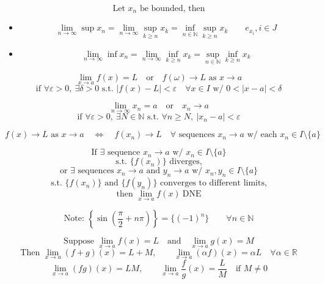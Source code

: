 \documentclass[11pt]{article}
\begin{document}


\[
\text{Let } x_n \text{ be bounded, then}
\]
\begin{itemize}
\item
\[
\lim_{n\to\infty}\sup x_n
=
\lim_{n\to\infty}\sup_{k\ge n} x_k
=
\inf_{n\in\mathbb N}\sup_{k\ge n}x_k
\qquad e_{x_i}, i\in J
\]
\item
\[
\lim_{n\to\infty}\inf x_n
=
\lim_{n\to\infty}\inf_{k\ge n} x_k
=
\sup_{n\in\mathbb N}\inf_{k\ge n}x_k
\]
\end{itemize}


\[
\lim_{x\to a} f(x)=L \quad \text{or} \quad f(\omega)\to L \text{ as } x\to a
\]
\[
\text{if } \forall \varepsilon>0,\ \exists \delta>0 \text{ s.t. }
|f(x)-L|<\varepsilon
\quad
\forall x\in I \text{ w/ } 0<|x-a|<\delta
\]


\[
\lim_{n\to\infty}x_n=a \quad \text{or} \quad x_n\to a
\]
\[
\text{if } \forall \varepsilon>0,\ \exists N\in\mathbb N \text{ s.t. }
\forall n\ge N,\ |x_n-a|<\varepsilon
\]


\[
f(x)\to L \text{ as } x\to a
\quad \Longleftrightarrow \quad
f(x_n)\to L
\quad \forall \text{ sequences } x_n\to a \text{ w/ each } x_n\in I\setminus\{a\}
\]


\[
\text{If } \exists \text{ sequence } x_n\to a \text{ w/ } x_n\in I\setminus\{a\}
\]
\[
\text{s.t. } \{f(x_n)\} \text{ diverges,}
\]
\[
\text{or } \exists \text{ sequences } x_n\to a \text{ and } y_n\to a
\text{ w/ } x_n,y_n\in I\setminus\{a\}
\]
\[
\text{s.t. } \{f(x_n)\} \text{ and } \{f(y_n)\} \text{ converges to different limits,}
\]
\[
\text{then } \lim_{x\to a} f(x)\ \mathrm{DNE}
\]

\newpage


\[
\text{Note: } \left\{\sin\left(\frac{\pi}{2}+n\pi\right)\right\}=\{(-1)^n\}
\qquad \forall n\in\mathbb N
\]


\[
\text{Suppose } \lim_{x\to a}f(x)=L \quad \text{and} \quad \lim_{x\to a}g(x)=M
\]
\[
\text{Then } \lim_{x\to a}(f+g)(x)=L+M,\qquad
\lim_{x\to a}(\alpha f)(x)=\alpha L\quad \forall \alpha\in\mathbb R
\]
\[
\lim_{x\to a}(fg)(x)=LM,\qquad
\lim_{x\to a}\frac{f}{g}(x)=\frac{L}{M}\quad \text{if }M\ne0
\]
\end{document}
